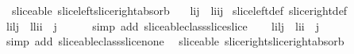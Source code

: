\begin{isabellebody}
{\isafoldproof}%
%
\isadelimproof
\isanewline
%
\endisadelimproof
\isanewline
{}\isamarkupfalse%
\ {\isacharparenleft}\ sliceable{\isacharparenright}\ slice{\isacharunderscore}left{\isacharunderscore}slice{\isacharunderscore}right{\isacharunderscore}absorb{\isacharcolon}\ \isanewline
\ \ {\isachardoublequoteopen}{\isacharparenleft}l{\isasymdagger}i{\isachardot}{\isachardot}{\isacharparenright}{\isasymdagger}{\isachardot}{\isachardot}j\ {\isacharequal}\ l{\isasymdagger}i{\isachardot}{\isachardot}{\isacharparenleft}i{\isacharplus}j{\isacharparenright}{\isachardoublequoteclose}\isanewline
%
\isadelimproof
%
\endisadelimproof
%
\isatagproof
{}\isamarkupfalse%
\ slice{\isacharunderscore}left{\isacharunderscore}def\ slice{\isacharunderscore}right{\isacharunderscore}def\isanewline
{}\isamarkupfalse%
\ {\isacharminus}\isanewline
\ \ \isamarkupfalse%
\ {\isachardoublequoteopen}{\isacharparenleft}l{\isasymdagger}i{\isachardot}{\isachardot}{\isacharparenleft}{\isacharhash}l{\isacharparenright}{\isacharparenright}{\isasymdagger}{}{\isachardot}{\isachardot}j\ {\isacharequal}\ {\isacharparenleft}l{\isasymdagger}{}{\isachardot}{\isachardot}{\isacharparenleft}{\isacharhash}l{\isacharparenright}{\isacharparenright}{\isasymdagger}i{\isachardot}{\isachardot}{\isacharparenleft}i\ {\isacharplus}\ j{\isacharparenright}{\isachardoublequoteclose}\isanewline
\ \ \ \ \isamarkupfalse%
\ {\isacharparenleft}simp\ add{\isacharcolon}\ sliceable{\isacharunderscore}class{\isachardot}slice{\isacharunderscore}slice{\isacharparenright}\isanewline
\ \ \isamarkupfalse%
\ {\isachardoublequoteopen}{\isacharparenleft}l{\isasymdagger}i{\isachardot}{\isachardot}{\isacharparenleft}{\isacharhash}l{\isacharparenright}{\isacharparenright}{\isasymdagger}{}{\isachardot}{\isachardot}j\ {\isacharequal}\ l{\isasymdagger}i{\isachardot}{\isachardot}{\isacharparenleft}i\ {\isacharplus}\ j{\isacharparenright}{\isachardoublequoteclose}\isanewline
\ \ \ \ \isamarkupfalse%
\ {\isacharparenleft}simp\ add{\isacharcolon}\ sliceable{\isacharunderscore}class{\isachardot}slice{\isacharunderscore}none{\isacharparenright}\isanewline
{}\isamarkupfalse%
%
\endisatagproof
{\isafoldproof}%
%
\isadelimproof
\isanewline
%
\endisadelimproof
\isanewline
{}\isamarkupfalse%
\ {\isacharparenleft}\ sliceable{\isacharparenright}\ slice{\isacharunderscore}right{\isacharunderscore}slice{\isacharunderscore}right{\isacharunderscore}absorb{\isacharcolon}\ \isanewline

\end{isabellebody}
